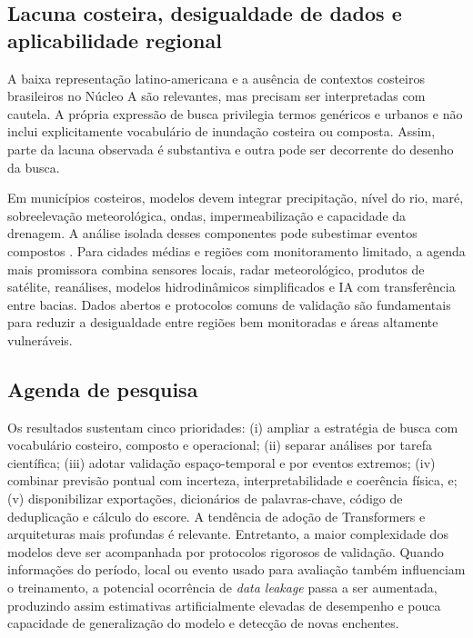 \subsection{Lacuna costeira, desigualdade de dados e aplicabilidade regional}

A baixa representação latino-americana e a ausência de contextos costeiros brasileiros no Núcleo A são relevantes, mas precisam ser interpretadas com cautela. A própria expressão de busca privilegia termos genéricos e urbanos e não inclui explicitamente vocabulário de inundação costeira ou composta. Assim, parte da lacuna observada é substantiva e outra pode ser decorrente do desenho da busca.

Em municípios costeiros, modelos devem integrar precipitação, nível do rio, maré, sobreelevação meteorológica, ondas, impermeabilização e capacidade da drenagem. A análise isolada desses componentes pode subestimar eventos compostos \cite{wahl2015}. Para cidades médias e regiões com monitoramento limitado, a agenda mais promissora combina sensores locais, radar meteorológico, produtos de satélite, reanálises, modelos hidrodinâmicos simplificados e IA com transferência entre bacias. Dados abertos e protocolos comuns de validação são fundamentais para reduzir a desigualdade entre regiões bem monitoradas e áreas altamente vulneráveis.

\subsection{Agenda de pesquisa}

Os resultados sustentam cinco prioridades: (i) ampliar a estratégia de busca com vocabulário costeiro, composto e operacional; (ii) separar análises por tarefa científica; (iii) adotar validação espaço-temporal e por eventos extremos; (iv) combinar previsão pontual com incerteza, interpretabilidade e coerência física, e; (v) disponibilizar exportações, dicionários de palavras-chave, código de deduplicação e cálculo do escore. A tendência de adoção de Transformers e arquiteturas mais profundas é relevante. Entretanto, a maior complexidade dos modelos deve ser acompanhada por protocolos rigorosos de validação. Quando informações do período, local ou evento usado para avaliação também influenciam o treinamento, a potencial ocorrência de \textit{data leakage} passa a ser aumentada, produzindo assim estimativas artificialmente elevadas de desempenho e pouca capacidade de generalização do modelo e detecção de novas enchentes.

